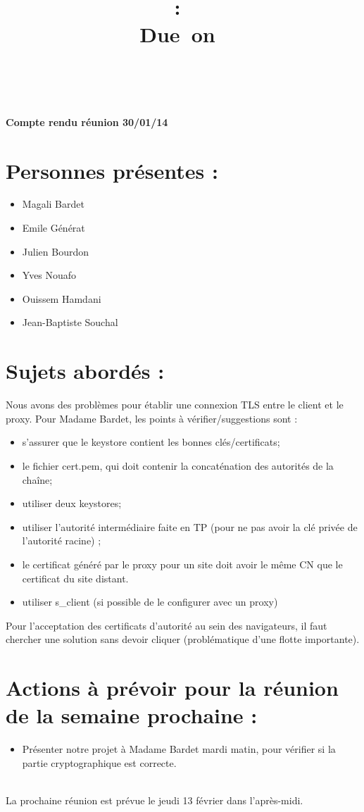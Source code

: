 \documentclass[a4paper,11pt,french]{article}
\title{
\vspace{2in}
\textmd{\textbf{\hmwkClass :\ \hmwkTitle}}\\
\normalsize\vspace{0.1in}\small{Due\ on\ \hmwkDueDate}\\
\vspace{0.1in}\large{\textit{\hmwkClassInstructor\ \hmwkClassTime}}
\vspace{3in}
}
\author{\hmwkAuthorName}
\date{} %
\newcommand{\hmwkDocName}{Compte rendu réunion 30/01/14} %
\begin{document}
\newcount\startdate
\newcount\daynum
\pagestyle{fancy}

\vspace*{5cm}
\begin{center}\textbf{\Huge{\hmwkDocName}}\end{center}
\vspace*{4.5cm}

\newpage




\section{Personnes présentes :}
\begin{itemize}
  \item Magali Bardet
  \item Emile Générat
  \item Julien Bourdon
  \item Yves Nouafo
  \item Ouissem Hamdani
  \item Jean-Baptiste Souchal
\end{itemize}

\section{Sujets abordés :}
Nous avons des problèmes pour établir une connexion TLS entre le client et le proxy.
Pour Madame Bardet, les points à vérifier/suggestions sont :
\begin{itemize}
\item s'assurer que le keystore contient les bonnes clés/certificats;
  \item le fichier cert.pem, qui doit contenir la concaténation des autorités de la chaîne;
  \item utiliser deux keystores;
  \item utiliser l'autorité intermédiaire faite en TP (pour ne pas avoir la clé privée de l'autorité racine) ;
  \item le certificat généré par le proxy pour un site doit avoir le même CN que le certificat du site distant.
  \item utiliser s\_client (si possible de le configurer avec un proxy)  
\end{itemize}

Pour l'acceptation des certificats d'autorité au sein des navigateurs, il faut chercher une solution sans devoir cliquer (problématique d'une flotte importante).

\section{Actions à prévoir pour la réunion de la semaine prochaine :}
\begin{itemize}
  \item Présenter notre projet à Madame Bardet mardi matin, pour vérifier si la partie cryptographique est correcte.
\end{itemize}
~\\
La prochaine réunion est prévue le jeudi 13 février dans l'après-midi.
\end{document}
